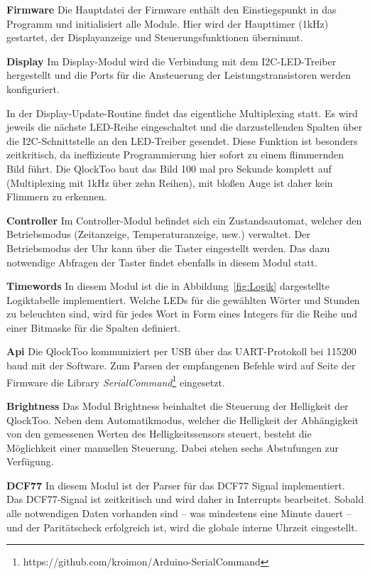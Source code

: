 \begin{multicols}{2}
\textbf{Firmware}
Die Hauptdatei der Firmware enthält den Einstiegspunkt in das Programm und initialisiert alle Module. Hier wird der Haupttimer (1kHz) gestartet, der Displayanzeige und Steuerungsfunktionen übernimmt.

\textbf{Display}
Im Display-Modul wird die Verbindung mit dem I2C-LED-Treiber hergestellt und die Ports für die Ansteuerung der Leistungstransistoren werden konfiguriert.

In der Display-Update-Routine findet das eigentliche Multiplexing statt. Es wird jeweils die nächste LED-Reihe eingeschaltet und die darzustellenden Spalten über die I2C-Schnittstelle an den LED-Treiber gesendet.
Diese Funktion ist besonders zeitkritisch, da ineffiziente Programmierung hier sofort zu einem flimmernden Bild führt.
Die QlockToo baut das Bild 100 mal pro Sekunde komplett auf (Multiplexing mit 1kHz über zehn Reihen), mit bloßen Auge ist daher kein Flimmern zu erkennen.

\textbf{Controller}
Im Controller-Modul befindet sich ein Zustandsautomat, welcher den Betriebsmodus (Zeitanzeige, Temperaturanzeige, usw.) verwaltet.
Der Betriebsmodus der Uhr kann über die Taster eingestellt werden. Das dazu notwendige Abfragen der Taster findet ebenfalls in diesem Modul statt.

\textbf{Timewords}
In diesem Modul ist die in Abbildung~\ref{fig:Logik} dargestellte Logiktabelle implementiert.
Welche LEDs für die gewählten Wörter und Stunden zu beleuchten sind, wird für jedes Wort in Form eines Integers für die Reihe und einer Bitmaske für die Spalten definiert.

\textbf{Api}
Die QlockToo kommuniziert per USB über das UART-Protokoll bei 115200 baud mit der Software.
Zum Parsen der empfangenen Befehle wird auf Seite der Firmware die Library \emph{SerialCommand}\footnote{https://github.com/kroimon/Arduino-SerialCommand} eingesetzt.

\textbf{Brightness}
Das Modul Brightness beinhaltet die Steuerung der Helligkeit der QlockToo. Neben dem Automatikmodus, welcher die Helligkeit der Abhängigkeit von den gemessenen Werten des Helligkeitssensors steuert, besteht die Möglichkeit einer manuellen Steuerung. Dabei stehen sechs Abstufungen zur Verfügung.

\textbf{DCF77}
In diesem Modul ist der Parser für das DCF77 Signal implementiert. Das DCF77-Signal ist zeitkritisch und wird daher in Interrupts bearbeitet.
Sobald alle notwendigen Daten vorhanden sind -- was mindestens eine Minute dauert -- und der Paritätscheck erfolgreich ist, wird die globale interne Uhrzeit eingestellt.


\end{multicols}
